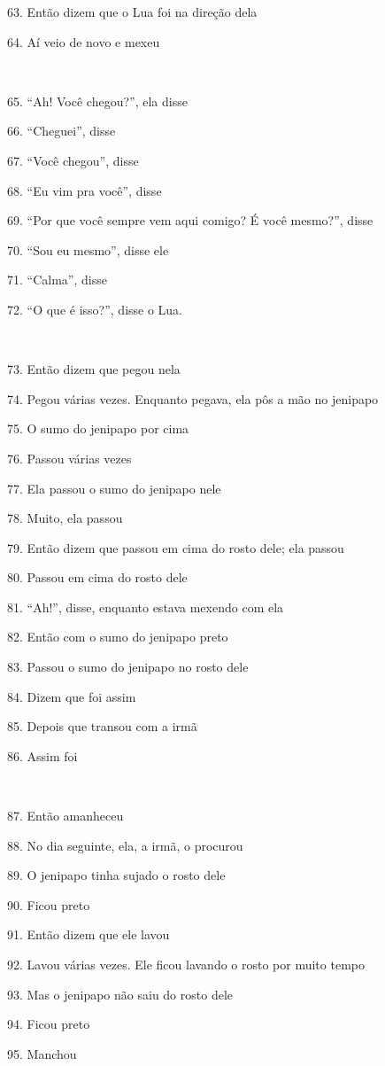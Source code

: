 63. Então dizem que o Lua foi na direção dela

64. Aí veio de novo e mexeu

~

65. ``Ah! Você chegou?'', ela disse

66. ``Cheguei'', disse

67. ``Você chegou'', disse

68. ``Eu vim pra você'', disse

69. ``Por que você sempre vem aqui comigo? É você mesmo?'', disse

70. ``Sou eu mesmo'', disse ele

71. ``Calma'', disse

72. ``O que é isso?'', disse o Lua.

~

73. Então dizem que pegou nela

74. Pegou várias vezes. Enquanto pegava, ela pôs a mão no jenipapo

75. O sumo do jenipapo por cima

76. Passou várias vezes

77. Ela passou o sumo do jenipapo nele

78. Muito, ela passou

79. Então dizem que passou em cima do rosto dele; ela passou

80. Passou em cima do rosto dele

81. ``Ah!'', disse, enquanto estava mexendo com ela

82. Então com o sumo do jenipapo preto

83. Passou o sumo do jenipapo no rosto dele

84. Dizem que foi assim

85. Depois que transou com a irmã

86. Assim foi

~

87. Então amanheceu

88. No dia seguinte, ela, a irmã, o procurou

89. O jenipapo tinha sujado o rosto dele

90. Ficou preto

91. Então dizem que ele lavou

92. Lavou várias vezes. Ele ficou lavando o rosto por muito tempo

93. Mas o jenipapo não saiu do rosto dele

94. Ficou preto

95. Manchou


